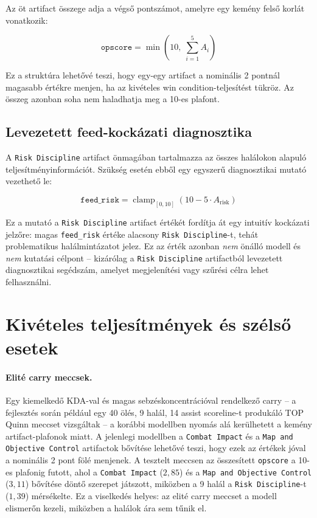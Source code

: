 ﻿\documentclass[a4paper,12pt]{report}
\begin{document}
Az öt artifact összege adja a végső pontszámot, amelyre egy kemény felső korlát vonatkozik:

\begin{equation}
\texttt{opscore} = \min\!\left(10,\; \sum_{i=1}^{5} A_i\right)
\end{equation}

Ez a struktúra lehetővé teszi, hogy egy-egy artifact a nominális 2 pontnál magasabb értékre menjen, ha az kivételes win condition-teljesítést tükröz. Az összeg azonban soha nem haladhatja meg a 10-es plafont.

\subsection{Levezetett feed-kockázati diagnosztika}

A \texttt{Risk Discipline} artifact önmagában tartalmazza az összes halálokon alapuló teljesítményinformációt. Szükség esetén ebből egy egyszerű diagnosztikai mutató vezethető le:

\begin{equation}
\texttt{feed\_risk} = \operatorname{clamp}_{[0,10]}\!\left(10 - 5 \cdot A_{\text{risk}}\right)
\end{equation}

Ez a mutató a \texttt{Risk Discipline} artifact értékét fordítja át egy intuitív kockázati jelzőre: magas \texttt{feed\_risk} értéke alacsony \texttt{Risk Discipline}-t, tehát problematikus halálmintázatot jelez. Ez az érték azonban \emph{nem} önálló modell és \emph{nem} kutatási célpont -- kizárólag a \texttt{Risk Discipline} artifactból levezetett diagnosztikai segédszám, amelyet megjelenítési vagy szűrési célra lehet felhasználni.

\section{Kivételes teljesítmények és szélső esetek}

\paragraph{Elité carry meccsek.}
Egy kiemelkedő KDA-val és magas sebzéskoncentrációval rendelkező carry -- a fejlesztés során például egy 40 ölés, 9 halál, 14 assist scoreline-t produkáló TOP Quinn meccset vizsgáltak -- a korábbi modellben nyomás alá kerülhetett a kemény artifact-plafonok miatt. A jelenlegi modellben a \texttt{Combat Impact} és a \texttt{Map and Objective Control} artifactok bővítése lehetővé teszi, hogy ezek az értékek jóval a nominális 2 pont fölé menjenek. A tesztelt meccsen az összesített \texttt{opscore} a 10-es plafonig futott, ahol a \texttt{Combat Impact} ($2{,}85$) és a \texttt{Map and Objective Control} ($3{,}11$) bővítése döntő szerepet játszott, miközben a 9 halál a \texttt{Risk Discipline}-t ($1{,}39$) mérsékelte. Ez a viselkedés helyes: az elité carry meccset a modell elismerőn kezeli, miközben a halálok ára sem tűnik el.
\end{document}
